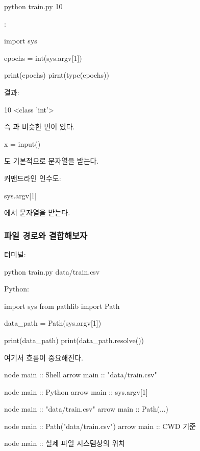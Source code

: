 \begin{dhkzsh}
python train.py 10
\end{dhkzsh}

:

\begin{dhkcode}
import sys

epochs = int(sys.argv[1])

print(epochs)
pirnt(type(epochs))
\end{dhkcode}

결과:

\begin{dhkzsh}
10
<class 'int'>
\end{dhkzsh}

즉 과 비슷한 면이 있다.

\begin{dhkzsh}
x = input()
\end{dhkzsh}

도 기본적으로 문자열을 받는다.

커맨드라인 인수도:

\begin{dhkzsh}
sys.argv[1]
\end{dhkzsh}

에서 문자열을 받는다.

\subsubsection{파일 경로와 결합해보자}

터미널:

\begin{dhkzsh}
python train.py data/train.csv
\end{dhkzsh}

Python:

\begin{dhkcode}
import sys
from pathlib import Path

data_path = Path(sys.argv[1])

print(data_path)
print(data_path.resolve())
\end{dhkcode}

여기서 흐름이 중요해진다.

\begin{dhkbranch}[in=8]
node main :: Shell
arrow main :: "data/train.csv"

node main :: Python
arrow main :: sys.argv[1]

node main :: "data/train.csv"
arrow main :: Path(...)

node main :: Path("data/train.csv")
arrow main :: CWD 기준

node main :: 실제 파일 시스템상의 위치
\end{dhkbranch}

